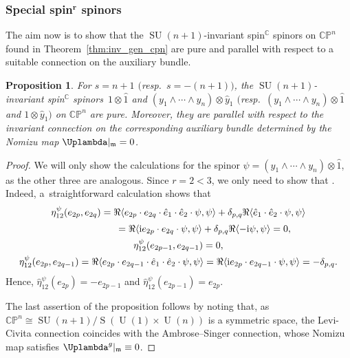 \documentclass[pdftex]{sigma}
\numberwithin{equation}{section}
\newtheorem{Proposition}[Theorem]{Proposition}
{ \theoremstyle{definition}
	\newtheorem{Definition}[Theorem]{Definition}
	\newtheorem{Note}[Theorem]{Note}
	\newtheorem{Example}[Theorem]{Example}
	\newtheorem{Remark}[Theorem]{Remark} }
\newcommand{\C}{\mathbb{C}} %
\DeclareMathOperator{\Id}{Id}
\DeclareMathOperator{\SU}{SU}
\DeclareMathOperator{\U}{U}
\DeclareMathOperator{\Special}{S}
\begin{document}
		
		\subsubsection[Special spin\^{}r spinors]{Special spin$^{\boldsymbol{r}}$ spinors}
		
		The aim now is to show that the $\SU(n+1)$-invariant spin$^{\mathbb{C}}$ spinors on $\mathbb{CP}^n$ found in Theorem~\ref{thm:inv_gen_cpn} are pure and parallel with respect to a suitable connection on the auxiliary bundle.
		
		\begin{Proposition}\label{lemma:her_cpn_pure_lemma}
			For $s = n+1$ $($resp.\ $s = -(n+1))$, the $\SU(n+1)$-invariant spin$^{\C}$ spinors~${1 \otimes \hat{1}}$ and $(y_1 \wedge \cdots \wedge y_n) \otimes \hat{y}_1$ $\big($resp.\ $(y_1 \wedge \cdots \wedge y_n) \otimes \hat{1}$ and $1 \otimes \hat{y}_1\big)$ on $\mathbb{CP}^{n}$ are pure. Moreover, they are parallel with respect to the invariant connection on the corresponding auxiliary bundle determined by the Nomizu map $\Uplambda \rvert_{\mathfrak{m}} = 0$.
		\end{Proposition}
		\begin{proof}
			We will only show the calculations for the spinor $\psi = (y_1 \wedge \cdots \wedge y_n) \otimes \hat{1}$, as the other three are analogous. Since $r=2<3$, we only need to show that \smash{$\bigl(\hat{\eta}^{\psi}_{12}\bigr)^2 = - \Id$}. Indeed, a~straightforward calculation shows that
			\begin{gather*}
				\eta^{\psi}_{12} (e_{2p}, e_{2q}) = \Re \langle e_{2p} \cdot e_{2q} \cdot \hat{e}_1 \cdot \hat{e}_2 \cdot \psi , \psi \rangle + \delta_{p,q} \Re \langle \hat{e}_1 \cdot \hat{e}_2 \cdot \psi , \psi \rangle \\
			\phantom{\eta^{\psi}_{12} (e_{2p}, e_{2q}) }{}	 = \Re \langle {\rm i} e_{2p} \cdot e_{2q} \cdot \psi , \psi \rangle + \delta_{p,q}\Re \langle -{\rm i} \psi , \psi \rangle = 0, \\
				\eta^{\psi}_{12} (e_{2p-1}, e_{2q-1}) = 0, \\
				\eta^{\psi}_{12} (e_{2p}, e_{2q-1}) = \Re \langle e_{2p} \cdot e_{2q-1} \cdot \hat{e}_1 \cdot \hat{e}_2 \cdot \psi , \psi \rangle = \Re \langle {\rm i} e_{2p} \cdot e_{2q-1} \cdot \psi , \psi \rangle = - \delta_{p,q}.
			\end{gather*}
			Hence, $\hat{\eta}^{\psi}_{12} (e_{2p}) = - e_{2p-1}$ and $\hat{\eta}^{\psi}_{12} (e_{2p-1}) = e_{2p}$.
			
			The last assertion of the proposition follows by noting that, as $\C\mathbb{P}^n \cong \SU(n+1)/\Special(\U(1)\times \U(n))$ is a symmetric space, the Levi-Civita connection coincides with the Ambrose--Singer connection, whose Nomizu map satisfies $\Uplambda^g\rvert_{\mathfrak{m}} \equiv 0$.
		\end{proof}
		
\end{document}
